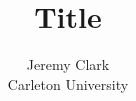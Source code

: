 \documentclass[letterpaper,10pt]{article}
\begin{document}
\title{\Large \bf Title}

\author{{\rm Jeremy Clark}\\Carleton University}

\maketitle




\clearpage
\appendix
\end{document}
